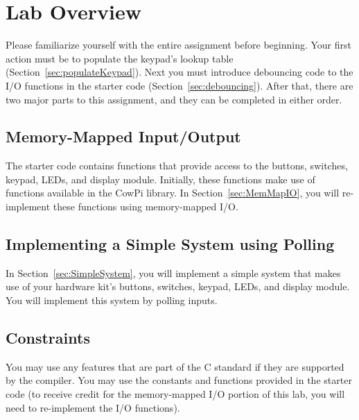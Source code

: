 \section{Lab Overview}

Please familiarize yourself with the entire assignment before beginning.
Your first action must be to populate the keypad's lookup table (Section~\ref{sec:populateKeypad}).
Next you must introduce debouncing code to the I/O functions in the starter code (Section~\ref{sec:debouncing}).
After that, there are two major parts to this assignment, and they can be completed in either order.

\subsection{Memory-Mapped Input/Output}

The starter code contains functions that provide access to the buttons, switches, keypad, LEDs, and display module.
Initially, these functions make use of functions available in the CowPi library.
In Section~\ref{sec:MemMapIO}, you will re-implement these functions using memory-mapped I/O.

\subsection{Implementing a Simple System using Polling}

In Section~\ref{sec:SimpleSystem}, you will implement a simple system that makes use of your hardware kit's buttons, switches, keypad, LEDs, and display module.
You will implement this system by polling inputs.


\subsection{Constraints} \label{sec:Constraints}

You may use any features that are part of the C standard if they are supported by the compiler. You may use the constants and functions provided in the starter code (to receive credit for the memory-mapped I/O portion of this lab, you will need to re-implement the I/O functions).

